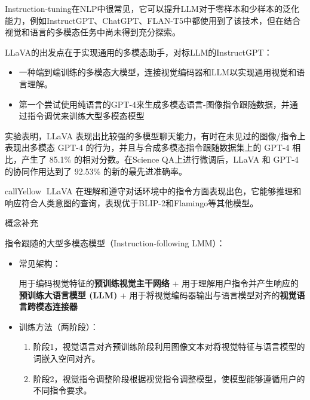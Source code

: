 \documentclass[zihao=false,fontset=windows]{ctexart}
\newcommand{\hlg}[1]{\colorbox{hlGreen}{#1}}
\newcommand{\hlb}[1]{\colorbox{hlBlue}{#1}}
\newcommand{\hlp}[1]{\colorbox{hlPurple}{#1}}
\newcommand{\hlo}[1]{\colorbox{hlOrange}{#1}}
\newcommand{\hly}[1]{\colorbox{hlYellow}{#1}}
\begin{document}
Instruction-tuning在NLP中很常见，它可以提升LLM对于零样本和少样本的泛化能力，例如InstructGPT、ChatGPT、FLAN-T5中都使用到了该技术，但在结合视觉和语言的多模态任务中尚未得到充分探索。\par

LLaVA的出发点在于实现通用的多模态助手，对标LLM的InstructGPT：\par
\begin{itemize}
\item 一种端到端训练的多模态大模型，连接视觉编码器和LLM以实现通用视觉和语言理解。
\item 第一个尝试使用纯语言的GPT-4来生成多模态语言-图像指令跟随数据，并通过指令调优来训练大型多模态模型
\end{itemize}

实验表明，LLaVA 表现出比较强的多模型聊天能力，有时在未见过的图像/指令上表现出多模态 GPT-4 的行为，并且与合成多模态指令跟随数据集上的 GPT-4 相比，产生了 85.1\% 的相对分数。在Science QA上进行微调后，LLaVA 和 GPT-4 的协同作用达到了 92.53\% 的新的最先进准确率。\par

\begin{feishubox}{callYellow}{🌟}
LLaVA 在理解和遵守对话环境中的指令方面表现出色，它能够推理和响应符合人类意图的查询，表现优于BLIP-2和Flamingo等其他模型。\par
\end{feishubox}

\colorbox{feishuPinkBg}{概念补充}\par

指令跟随的大型多模态模型（Instruction-following LMM）：\par
\begin{itemize}
\item 常见架构：
\par
\hlg{用于编码视觉特征的}\hlg{\textbf{预训练视觉主干网络}} + \hlb{用于理解用户指令并产生响应的}\hlb{\textbf{预训练大语言模型 (LLM)}} \textbf{ }+ \hlp{用于将视觉编码器输出与语言模型对齐的}\hlp{\textbf{视觉语言跨模态连接器}}
\item 训练方法（两阶段）：
\begin{enumerate}[label=\textcolor{feishuBlue}{\alph*.}]
\item \hlo{阶段1}，视觉语言对齐预训练阶段利用图像文本对将视觉特征与语言模型的词嵌入空间对齐。
\item \hly{阶段2}，视觉指令调整阶段根据视觉指令调整模型，使模型能够遵循用户的不同指令要求。
\end{enumerate}
\end{itemize}
\end{document}
